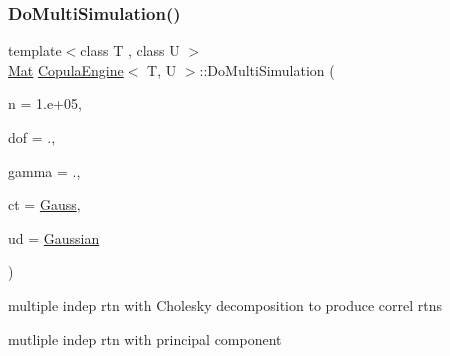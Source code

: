 \hypertarget{classCopulaEngine_a7074287ea29264912673d2d12d38bcdc}{}\label{classCopulaEngine_a7074287ea29264912673d2d12d38bcdc} 
\subsubsection{\texorpdfstring{Do\+Multi\+Simulation()}{DoMultiSimulation()}}
{\footnotesize\ttfamily template$<$class T , class U $>$ \\
\hyperlink{compute__returns__eigen_8h_ae14dd28696f743e067dbd2594616bad6}{Mat} \hyperlink{classCopulaEngine}{Copula\+Engine}$<$ T, U $>$\+::Do\+Multi\+Simulation (\begin{DoxyParamCaption}\item[{double}]{n = {\ttfamily 1.e+05},  }\item[{double}]{dof = {.},  }\item[{double}]{gamma = {.},  }\item[{\hyperlink{rng_8h_aff2c6be1fded3d6d996b850e2eb87c25}{copula\+Type}}]{ct = {\ttfamily \hyperlink{rng_8h_aff2c6be1fded3d6d996b850e2eb87c25ab15a7891aa5223439e4692a1048cb220}{Gauss}},  }\item[{\hyperlink{mc__engine_8h_aeb3b337d49b67199ac031f705d206198}{underlying\+Process}}]{ud = {\ttfamily \hyperlink{mc__engine_8h_aeb3b337d49b67199ac031f705d206198aa11844f44df96808eb4e519ba04f088c}{Gaussian}} }\end{DoxyParamCaption})\hspace{0.3cm}{\ttfamily [inline]}}

multiple indep rtn with Cholesky decomposition to produce correl rtns

mutliple indep rtn with principal component \hypertarget{classCopulaEngine_ac14e86c4f0025bcc82e680896e1c7e3a}{}\label{classCopulaEngine_ac14e86c4f0025bcc82e680896e1c7e3a} 
